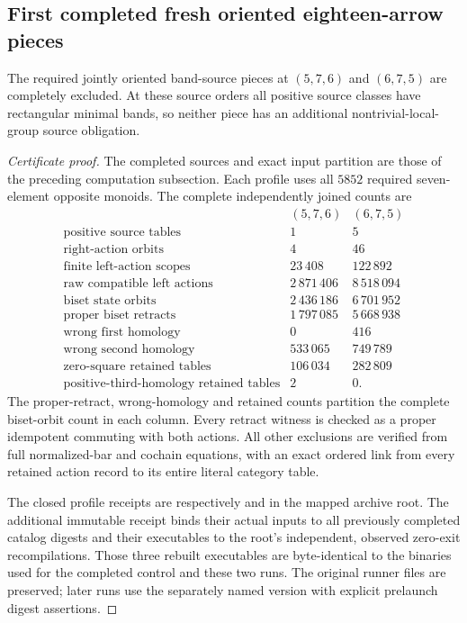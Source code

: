\subsection{First completed fresh oriented eighteen-arrow pieces}

\begin{proposition}
\label{CP2:A-oriented-eighteen-first-two-pieces}
The required jointly oriented band-source pieces at
$(5,7,6)$ and $(6,7,5)$ are completely excluded.  At these
source orders all positive source classes have rectangular
minimal bands, so neither piece has an additional
nontrivial-local-group source obligation.
\end{proposition}
\begin{proof}[Certificate proof]
The completed sources and exact input partition are those
of the preceding computation subsection.  Each profile
uses all $5852$ required seven-element opposite monoids.
The complete independently joined counts are
\[
\begin{array}{c|r|r}
 & (5,7,6)&(6,7,5)\\\hline
\text{positive source tables}&1&5\\
\text{right-action orbits}&4&46\\
\text{finite left-action scopes}&23\,408&122\,892\\
\text{raw compatible left actions}&2\,871\,406&8\,518\,094\\
\text{biset state orbits}&2\,436\,186&6\,701\,952\\
\text{proper biset retracts}&1\,797\,085&5\,668\,938\\
\text{wrong first homology}&0&416\\
\text{wrong second homology}&533\,065&749\,789\\
\text{zero-square retained tables}&106\,034&282\,809\\
\text{positive-third-homology retained tables}&2&0.
\end{array}
\]
The proper-retract, wrong-homology and retained counts
partition the complete biset-orbit count in each column.
Every retract witness is checked as a proper idempotent
commuting with both actions.  All other exclusions are
verified from full normalized-bar and cochain equations,
with an exact ordered link from every retained action
record to its entire literal category table.

The closed profile receipts are respectively
 and
 in the mapped
 archive root.
The additional immutable receipt
 binds their
actual inputs to all previously completed catalog digests
and their executables to the root's independent, observed
zero-exit recompilations.  Those three rebuilt executables
are byte-identical to the binaries used for the completed
control and these two runs.  The original runner files
are preserved; later runs use the separately named
version with explicit prelaunch digest assertions.
\end{proof}

